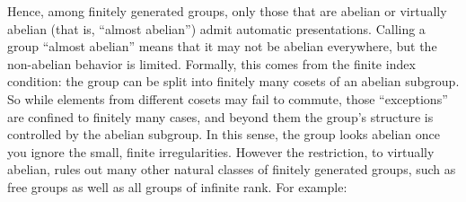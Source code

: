 \documentclass{pracalicmgr2025}
\theoremstyle{plain}            %
\theoremstyle{remark}           %
\theoremstyle{definition}       %
\begin{document}
Hence, among finitely generated groups, only those that are abelian or virtually abelian (that is, “almost abelian”) admit automatic presentations. Calling a group “almost abelian” means that it may not be abelian everywhere, but the non-abelian behavior is limited. Formally, this comes from the finite index condition: the group can be split into finitely many cosets of an abelian subgroup. So while elements from different cosets may fail to commute, those “exceptions” are confined to finitely many cases, and beyond them the group’s structure is controlled by the abelian subgroup. In this sense, the group looks abelian once you ignore the small, finite irregularities. However the restriction, to virtually abelian, rules out many other natural classes of finitely generated groups, such as free groups as well as all groups of infinite rank. For example:
\end{document}
